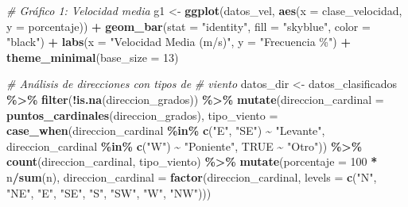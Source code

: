 \documentclass[
]{article}
\newenvironment{Shaded}{\begin{snugshade}}{\end{snugshade}}
\newcommand{\AttributeTok}[1]{\textcolor[rgb]{0.13,0.29,0.53}{#1}}
\newcommand{\CommentTok}[1]{\textcolor[rgb]{0.56,0.35,0.01}{\textit{#1}}}
\newcommand{\ConstantTok}[1]{\textcolor[rgb]{0.56,0.35,0.01}{#1}}
\newcommand{\DecValTok}[1]{\textcolor[rgb]{0.00,0.00,0.81}{#1}}
\newcommand{\FunctionTok}[1]{\textcolor[rgb]{0.13,0.29,0.53}{\textbf{#1}}}
\newcommand{\NormalTok}[1]{#1}
\newcommand{\OtherTok}[1]{\textcolor[rgb]{0.56,0.35,0.01}{#1}}
\newcommand{\SpecialCharTok}[1]{\textcolor[rgb]{0.81,0.36,0.00}{\textbf{#1}}}
\newcommand{\StringTok}[1]{\textcolor[rgb]{0.31,0.60,0.02}{#1}}
\begin{document}
\begin{Shaded}
\begin{Highlighting}[]
\CommentTok{\# Gráfico 1: Velocidad media}
\NormalTok{g1 }\OtherTok{\textless{}{-}} \FunctionTok{ggplot}\NormalTok{(datos\_vel, }\FunctionTok{aes}\NormalTok{(}\AttributeTok{x =}\NormalTok{ clase\_velocidad,}
    \AttributeTok{y =}\NormalTok{ porcentaje)) }\SpecialCharTok{+} \FunctionTok{geom\_bar}\NormalTok{(}\AttributeTok{stat =} \StringTok{"identity"}\NormalTok{,}
    \AttributeTok{fill =} \StringTok{"skyblue"}\NormalTok{, }\AttributeTok{color =} \StringTok{"black"}\NormalTok{) }\SpecialCharTok{+}
    \FunctionTok{labs}\NormalTok{(}\AttributeTok{x =} \StringTok{"Velocidad Media (m/s)"}\NormalTok{, }\AttributeTok{y =} \StringTok{"Frecuencia \%"}\NormalTok{) }\SpecialCharTok{+}
    \FunctionTok{theme\_minimal}\NormalTok{(}\AttributeTok{base\_size =} \DecValTok{13}\NormalTok{)}

\CommentTok{\# Análisis de direcciones con tipos de}
\CommentTok{\# viento}
\NormalTok{datos\_dir }\OtherTok{\textless{}{-}}\NormalTok{ datos\_clasificados }\SpecialCharTok{\%\textgreater{}\%}
    \FunctionTok{filter}\NormalTok{(}\SpecialCharTok{!}\FunctionTok{is.na}\NormalTok{(direccion\_grados)) }\SpecialCharTok{\%\textgreater{}\%}
    \FunctionTok{mutate}\NormalTok{(}\AttributeTok{direccion\_cardinal =} \FunctionTok{puntos\_cardinales}\NormalTok{(direccion\_grados),}
        \AttributeTok{tipo\_viento =} \FunctionTok{case\_when}\NormalTok{(direccion\_cardinal }\SpecialCharTok{\%in\%}
            \FunctionTok{c}\NormalTok{(}\StringTok{"E"}\NormalTok{, }\StringTok{"SE"}\NormalTok{) }\SpecialCharTok{\textasciitilde{}} \StringTok{"Levante"}\NormalTok{, direccion\_cardinal }\SpecialCharTok{\%in\%}
            \FunctionTok{c}\NormalTok{(}\StringTok{"W"}\NormalTok{) }\SpecialCharTok{\textasciitilde{}} \StringTok{"Poniente"}\NormalTok{, }\ConstantTok{TRUE} \SpecialCharTok{\textasciitilde{}} \StringTok{"Otro"}\NormalTok{)) }\SpecialCharTok{\%\textgreater{}\%}
    \FunctionTok{count}\NormalTok{(direccion\_cardinal, tipo\_viento) }\SpecialCharTok{\%\textgreater{}\%}
    \FunctionTok{mutate}\NormalTok{(}\AttributeTok{porcentaje =} \DecValTok{100} \SpecialCharTok{*}\NormalTok{ n}\SpecialCharTok{/}\FunctionTok{sum}\NormalTok{(n), }\AttributeTok{direccion\_cardinal =} \FunctionTok{factor}\NormalTok{(direccion\_cardinal,}
        \AttributeTok{levels =} \FunctionTok{c}\NormalTok{(}\StringTok{"N"}\NormalTok{, }\StringTok{"NE"}\NormalTok{, }\StringTok{"E"}\NormalTok{, }\StringTok{"SE"}\NormalTok{,}
            \StringTok{"S"}\NormalTok{, }\StringTok{"SW"}\NormalTok{, }\StringTok{"W"}\NormalTok{, }\StringTok{"NW"}\NormalTok{)))}


\end{Highlighting}
\end{Shaded}
\end{document}
